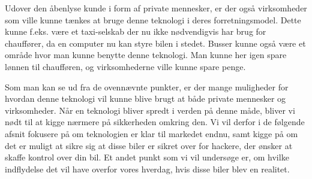 Udover den åbenlyse kunde i form af private mennesker, er der også virksomheder som ville kunne tænkes at bruge denne teknologi i deres forretningsmodel. Dette kunne f.eks. være et taxi-selskab der nu ikke nødvendigvis har brug for chauffører, da en computer nu kan styre bilen i stedet. Busser kunne også være et område hvor man kunne benytte denne teknologi. Man kunne her igen spare lønnen til chaufføren, og virksomhederne ville kunne spare penge.

Som man kan se ud fra de ovennævnte punkter, er der mange muligheder for hvordan denne teknologi vil kunne blive brugt at både private mennesker og virksomheder. Når en teknologi bliver spredt i verden på denne måde, bliver vi nødt til at kigge nærmere på sikkerheden omkring den. Vi vil derfor i de følgende afsnit fokusere på om teknologien er klar til markedet endnu, samt kigge på om det er muligt at sikre sig at disse biler er sikret over for hackere, der ønsker at skaffe kontrol over din bil. Et andet punkt som vi vil undersøge er, om hvilke indflydelse det vil have overfor vores hverdag, hvis disse biler blev en realitet.